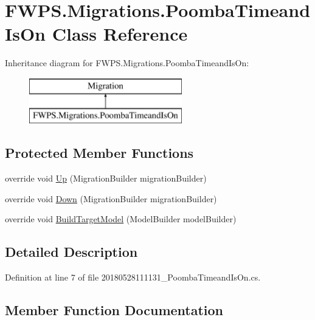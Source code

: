 \hypertarget{class_f_w_p_s_1_1_migrations_1_1_poomba_timeand_is_on}{}\section{F\+W\+P\+S.\+Migrations.\+Poomba\+Timeand\+Is\+On Class Reference}
\label{class_f_w_p_s_1_1_migrations_1_1_poomba_timeand_is_on}
Inheritance diagram for F\+W\+P\+S.\+Migrations.\+Poomba\+Timeand\+Is\+On\+:\begin{figure}[H]
\begin{center}
\leavevmode
\includegraphics[height=2.000000cm]{class_f_w_p_s_1_1_migrations_1_1_poomba_timeand_is_on}
\end{center}
\end{figure}
\subsection*{Protected Member Functions}
\begin{DoxyCompactItemize}
\item 
override void \mbox{\hyperlink{class_f_w_p_s_1_1_migrations_1_1_poomba_timeand_is_on_a2573613449d7d732ad40a5cbce58ac39}{Up}} (Migration\+Builder migration\+Builder)
\item 
override void \mbox{\hyperlink{class_f_w_p_s_1_1_migrations_1_1_poomba_timeand_is_on_a372703eaec18df3562f5455783e65e0c}{Down}} (Migration\+Builder migration\+Builder)
\item 
override void \mbox{\hyperlink{class_f_w_p_s_1_1_migrations_1_1_poomba_timeand_is_on_af52026bddde37384921031500aaa7af0}{Build\+Target\+Model}} (Model\+Builder model\+Builder)
\end{DoxyCompactItemize}


\subsection{Detailed Description}


Definition at line 7 of file 20180528111131\+\_\+\+Poomba\+Timeand\+Is\+On.\+cs.



\subsection{Member Function Documentation}
\mbox{\label{class_f_w_p_s_1_1_migrations_1_1_poomba_timeand_is_on_af52026bddde37384921031500aaa7af0}} 
